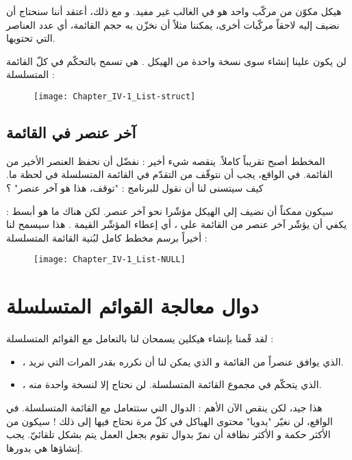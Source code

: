 \begin{information}
هيكل مكوّن من مركّب واحد هو في الغالب غير مفيد. و مع ذلك، أعتقد أننا سنحتاج أن نضيف إليه لاحقاً مركّبات أخرى، يمكننا مثلاً أن نخزّن به حجم القائمة، أي عدد العناصر التي تحتويها.
\end{information}

لن يكون علينا إنشاء سوى نسخة واحدة من الهيكل
.
هي تسمح بالتحكّم في كلّ القائمة المتسلسلة :
 
\begin{figure}[H]
	\centering
	\texttt{[image: Chapter\_IV-1\_List-struct]}
\end{figure}

\subsection{آخر عنصر في القائمة}

المخطط أصبح تقريباً كاملاً. ينقصه شيء أخير : نفضّل أن نحفظ العنصر الأخير من القائمة. في الواقع، يجب أن نتوقّف من التقدّم في القائمة المتسلسلة في لحظة ما. كيف سيتسنى لنا أن نقول للبرنامج : "توقف، هذا هو آخر عنصر" ؟

سيكون ممكناً أن نضيف إلى الهيكل 
مؤشّرا نحو آخر عنصر. لكن هناك ما هو أبسط : يكفي أن يؤشّر آخر عنصر من القائمة على
،
أي إعطاء المؤشّر
القيمة
.
هذا سيسمح لنا أخيراً برسم مخطط كامل لبُنية القائمة المتسلسلة :

\begin{figure}[H]
	\centering
	\texttt{[image: Chapter\_IV-1\_List-NULL]}
\end{figure}

\section{دوال معالجة القوائم المتسلسلة}

لقد قًمنا بإنشاء هيكلين يسمحان لنا بالتعامل مع القوائم المتسلسلة :

\begin{itemize}
	\item {}،
	الذي يوافق عنصراً من القائمة و الذي يمكن لنا أن نكرره بقدر المرات التي نريد.
	\item {}،
	الذي يتحكّم في مجموع القائمة المتسلسلة. لن نحتاج إلا لنسخة واحدة منه.
\end{itemize}

هذا جيد، لكن ينقص الآن الأهم : الدوال التي ستتعامل مع القائمة المتسلسلة. في الواقع، لن نغيّر "يدويا" محتوى الهياكل في كلّ مرة نحتاج فيها إلى ذلك ! سيكون من الأكثر حكمة و الأكثر نظافة أن نمرّ بدوال تقوم بجعل العمل يتم بشكل تلقائيّ. يجب إنشاؤها هي بدورها.

